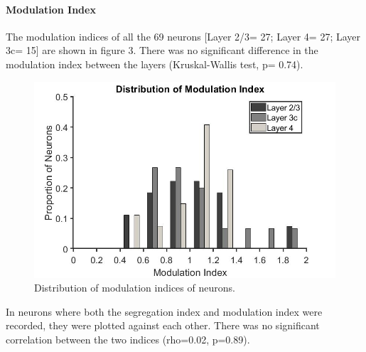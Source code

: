 	\paragraph{Modulation Index}
	The modulation indices of all the 69 neurons [Layer 2/3= 27; Layer 4= 27; Layer 3c= 15] are shown in figure 3. There was no significant difference in the modulation index between the layers (Kruskal-Wallis test, p= 0.74).
	
		\begin{figure}[]
		
		\includegraphics[width=\linewidth]{LinearV1/modind_layer_colour.jpg}
		\caption{Distribution of modulation indices of neurons.}
		\label{fig:fig4}
	\end{figure}


	In neurons where both the segregation index and modulation index were recorded, they were plotted against each other. There was no significant correlation between the two indices (rho=0.02, p=0.89). 
	
